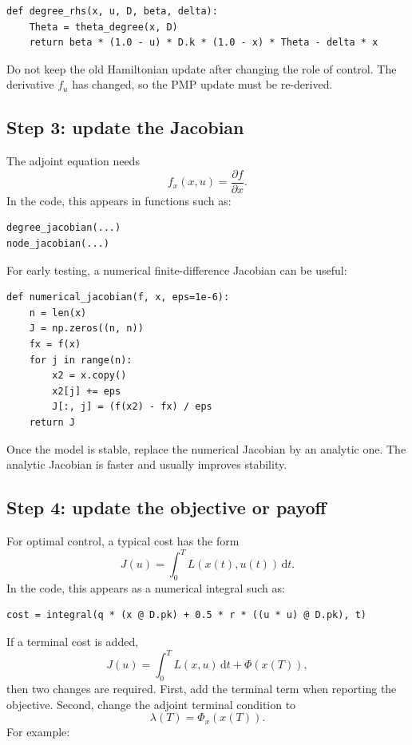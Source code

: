 \documentclass[11pt,a4paper]{article}
\newcommand{\dd}{\,\mathrm{d}}
\begin{document}
\begin{lstlisting}[style=py]
def degree_rhs(x, u, D, beta, delta):
    Theta = theta_degree(x, D)
    return beta * (1.0 - u) * D.k * (1.0 - x) * Theta - delta * x
\end{lstlisting}

Do not keep the old Hamiltonian update after changing the role of control. The derivative \(f_u\) has changed, so the PMP update must be re-derived.

\subsection{Step 3: update the Jacobian}

The adjoint equation needs
\[
  f_x(x,u)=\frac{\partial f}{\partial x}.
\]
In the code, this appears in functions such as:

\begin{lstlisting}[style=py]
degree_jacobian(...)
node_jacobian(...)
\end{lstlisting}

For early testing, a numerical finite-difference Jacobian can be useful:

\begin{lstlisting}[style=py]
def numerical_jacobian(f, x, eps=1e-6):
    n = len(x)
    J = np.zeros((n, n))
    fx = f(x)
    for j in range(n):
        x2 = x.copy()
        x2[j] += eps
        J[:, j] = (f(x2) - fx) / eps
    return J
\end{lstlisting}

Once the model is stable, replace the numerical Jacobian by an analytic one. The analytic Jacobian is faster and usually improves stability.

\subsection{Step 4: update the objective or payoff}

For optimal control, a typical cost has the form
\[
  J(u)=\int_0^T L(x(t),u(t))\dd t.
\]
In the code, this appears as a numerical integral such as:

\begin{lstlisting}[style=py]
cost = integral(q * (x @ D.pk) + 0.5 * r * ((u * u) @ D.pk), t)
\end{lstlisting}

If a terminal cost is added,
\[
  J(u)=\int_0^T L(x,u)\dd t+\Phi(x(T)),
\]
then two changes are required. First, add the terminal term when reporting the objective. Second, change the adjoint terminal condition to
\[
  \lambda(T)=\Phi_x(x(T)).
\]
For example:
\end{document}
